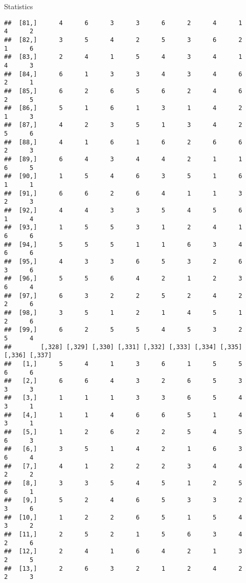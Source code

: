 \documentclass[
  ignorenonframetext,
]{beamer}
\begin{document}
\begin{frame}[fragile]{Statistics}
\begin{verbatim}
##  [81,]      4      6      3      3      6      2      4      1      4      2
##  [82,]      3      5      4      2      5      3      6      2      1      6
##  [83,]      2      4      1      5      4      3      4      1      4      3
##  [84,]      6      1      3      3      4      3      4      6      2      1
##  [85,]      6      2      6      5      6      2      4      6      2      5
##  [86,]      5      1      6      1      3      1      4      2      1      3
##  [87,]      4      2      3      5      1      3      4      2      5      6
##  [88,]      4      1      6      1      6      2      6      6      2      3
##  [89,]      6      4      3      4      4      2      1      1      6      5
##  [90,]      1      5      4      6      3      5      1      6      1      1
##  [91,]      6      6      2      6      4      1      1      3      2      3
##  [92,]      4      4      3      3      5      4      5      6      1      4
##  [93,]      1      5      5      3      1      2      4      1      6      6
##  [94,]      5      5      5      1      1      6      3      4      6      6
##  [95,]      4      3      3      6      5      3      2      6      3      6
##  [96,]      5      5      6      4      2      1      2      3      6      4
##  [97,]      6      3      2      2      5      2      4      2      2      6
##  [98,]      3      5      1      2      1      4      5      1      2      6
##  [99,]      6      2      5      5      4      5      3      2      5      4
##        [,328] [,329] [,330] [,331] [,332] [,333] [,334] [,335] [,336] [,337]
##   [1,]      5      4      1      3      6      1      5      5      6      6
##   [2,]      6      6      4      3      2      6      5      3      3      3
##   [3,]      1      1      1      3      3      6      5      4      3      1
##   [4,]      1      1      4      6      6      5      1      4      3      1
##   [5,]      1      2      6      2      2      5      4      5      6      3
##   [6,]      3      5      1      4      2      1      6      3      6      4
##   [7,]      4      1      2      2      2      3      4      4      2      2
##   [8,]      3      3      5      4      5      1      2      5      6      1
##   [9,]      5      2      4      6      5      3      3      2      3      6
##  [10,]      1      2      2      6      5      1      5      4      3      2
##  [11,]      2      5      2      1      5      6      3      4      2      6
##  [12,]      2      4      1      6      4      2      1      3      2      5
##  [13,]      2      6      3      2      1      2      4      2      2      3

\end{verbatim}
\end{frame}
\end{document}
